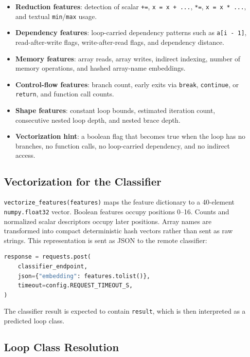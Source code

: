 \documentclass[11pt,a4paper]{article}
\begin{document}
\begin{itemize}[leftmargin=*]
  \item \textbf{Reduction features}: detection of scalar \texttt{+=},
        \texttt{x = x + ...}, \texttt{*=}, \texttt{x = x * ...}, and textual
        \texttt{min}/\texttt{max} usage.
  \item \textbf{Dependency features}: loop-carried dependency patterns such as
        \texttt{a[i - 1]}, read-after-write flags, write-after-read flags, and
        dependency distance.
  \item \textbf{Memory features}: array reads, array writes, indirect indexing,
        number of memory operations, and hashed array-name embeddings.
  \item \textbf{Control-flow features}: branch count, early exits via
        \texttt{break}, \texttt{continue}, or \texttt{return}, and function call
        counts.
  \item \textbf{Shape features}: constant loop bounds, estimated iteration
        count, consecutive nested loop depth, and nested brace depth.
  \item \textbf{Vectorization hint}: a boolean flag that becomes true when the
        loop has no branches, no function calls, no loop-carried dependency,
        and no indirect access.
\end{itemize}

\subsection{Vectorization for the Classifier}

\texttt{vectorize\_features(features)} maps the feature dictionary to a
40-element \texttt{numpy.float32} vector. Boolean features occupy positions
0--16. Counts and normalized scalar descriptors occupy later positions. Array
names are transformed into compact deterministic hash vectors rather than sent
as raw strings. This representation is sent as JSON to the remote classifier:

\begin{lstlisting}[language=Python]
response = requests.post(
    classifier_endpoint,
    json={"embedding": features.tolist()},
    timeout=config.REQUEST_TIMEOUT_S,
)
\end{lstlisting}

The classifier result is expected to contain \texttt{result}, which is then
interpreted as a predicted loop class.

\subsection{Loop Class Resolution}
\end{document}
